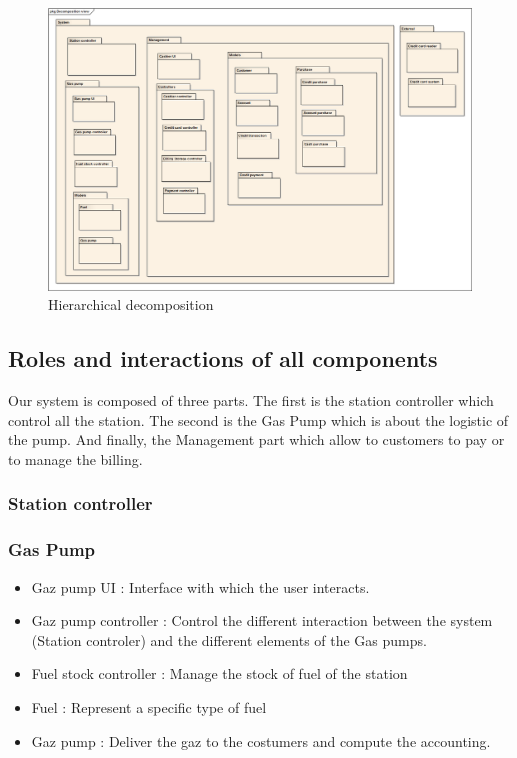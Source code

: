 \documentclass[11pt,a4paper]{article}
\begin{document}
\begin{figure}[H]
 \centering
 \includegraphics[width=\textwidth]{../DecompositionView.png} 
 \caption{Hierarchical decomposition}
 \label{fig:dep}
\end{figure}

\subsection{Roles and interactions of all components}

Our system is composed of three parts. The first is the station controller which control all the station. The second is the Gas Pump which is about the logistic of the pump. And finally, the Management part which allow to customers to pay or to manage the billing.

\subsubsection*{Station controller}

\subsubsection*{Gas Pump}
\begin{itemize}
\item{Gaz pump UI :} Interface with which the user interacts.
\item{Gaz pump controller :} Control the different interaction between the system (Station controler) and the different elements of the Gas pumps.
\item{Fuel stock controller :} Manage the stock of fuel of the station
\item{Fuel :} Represent a specific type of fuel
\item{Gaz pump :} Deliver the gaz to the costumers and compute the accounting. 
\end{itemize}
\end{document}
